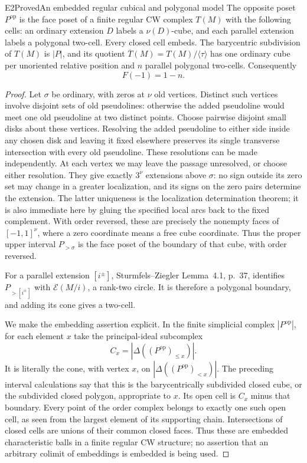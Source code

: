 \begin{resultenv}{E2}{Proved}{An embedded regular cubical and polygonal model}
The opposite poset $P^{\mathrm{op}}$ is the face poset of a finite regular CW
complex $T(M)$ with the following cells: an ordinary extension $D$ labels a
$\nu(D)$-cube, and each parallel extension labels a polygonal two-cell.
Every closed cell embeds. The barycentric subdivision of $T(M)$ is $|P|$,
and its quotient $\overline T(M)=T(M)/\langle\tau\rangle$ has one ordinary
cube per unoriented relative position and $n$ parallel polygonal two-cells.
Consequently
\[
 \boxed{F(-1)=1-n.}
\]
\end{resultenv}
\begin{proof}
Let $\sigma$ be ordinary, with zeros at $\nu$ old vertices. Distinct such
vertices involve disjoint sets of old pseudolines: otherwise the added
pseudoline would meet one old pseudoline at two distinct points. Choose
pairwise disjoint small disks about these vertices. Resolving the added
pseudoline to either side inside any chosen disk and leaving it fixed
elsewhere preserves its single transverse intersection with every old
pseudoline. These resolutions can be made independently. At each vertex we
may leave the passage unresolved, or choose either resolution. They give
exactly $3^\nu$ extensions above $\sigma$: no sign outside its zero set may
change in a greater localization, and its signs on the zero pairs determine
the extension. The latter uniqueness is the localization determination
theorem; it is also immediate here by gluing the specified local arcs back
to the fixed complement. With order reversed, these are precisely the
nonempty faces of $[-1,1]^\nu$, where a zero coordinate means a free cube
coordinate. Thus the proper upper interval $P_{>\sigma}$ is the face poset
of the boundary of that cube, with order reversed.

For a parallel extension $[i^\pm]$, Sturmfels--Ziegler Lemma~4.1, p.~37,
identifies $P_{>[i^\pm]}$ with $\mathcal E(M/i)$, a rank-two circle. It is
therefore a polygonal boundary, and adding its cone gives a two-cell.

We make the embedding assertion explicit. In the finite simplicial complex
$|P^{\mathrm{op}}|$, for each element $x$ take the principal-ideal
subcomplex
\[
 C_x=|\Delta((P^{\mathrm{op}})_{\leq x})|.
\]
It is literally the cone, with vertex $x$, on
$|\Delta((P^{\mathrm{op}})_{<x})|$. The preceding interval calculations say
that this is the barycentrically subdivided closed cube, or the subdivided
closed polygon, appropriate to $x$. Its open cell is $C_x$ minus that
boundary. Every point of the order complex belongs to exactly one such
open cell, as seen from the largest element of its supporting chain.
Intersections of closed cells are unions of their common closed faces.
Thus these are embedded characteristic balls in a finite regular CW
structure; no assertion that an arbitrary colimit of embeddings is embedded
is being used.


\end{proof}
